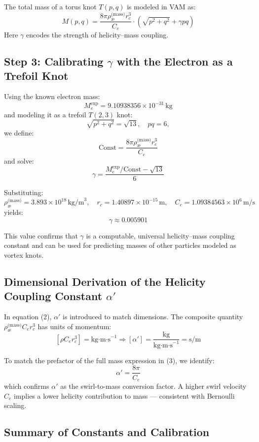 The total mass of a torus knot \( T(p,q) \) is modeled in VAM as:
\[
M(p,q) = \frac{8\pi \rho_\text{\ae}^{\text{(mass)}} r_c^3}{C_e} \cdot \left( \sqrt{p^2 + q^2} + \gamma pq \right)
\tag{3}
\]
Here \( \gamma \) encodes the strength of helicity–mass coupling.

\subsection*{Step 3: Calibrating \( \gamma \) with the Electron as a Trefoil Knot}

Using the known electron mass:
\[
M_e^{\text{exp}} = 9.10938356 \times 10^{-31} \, \text{kg}
\]
and modeling it as a trefoil \( T(2,3) \) knot:
\[
\sqrt{p^2 + q^2} = \sqrt{13}, \quad pq = 6,
\]
we define:
\[
\text{Const} = \frac{8\pi \rho_\text{\ae}^{\text{(mass)}} r_c^3}{C_e}
\]
and solve:
\[
\gamma = \frac{M_e^{\text{exp}} / \text{Const} - \sqrt{13}}{6}
\]

Substituting:
\[
\rho_\text{\ae}^{\text{(mass)}} = 3.893 \times 10^{18} \, \text{kg/m}^3, \quad
r_c = 1.40897 \times 10^{-15} \, \text{m}, \quad
C_e = 1.09384563 \times 10^6 \, \text{m/s}
\]
yields:
\[
\boxed{\gamma \approx 0.005901}
\]

This value confirms that \( \gamma \) is a computable, universal helicity–mass coupling constant and can be used for predicting masses of other particles modeled as vortex knots.

\subsection*{Dimensional Derivation of the Helicity Coupling Constant \( \alpha' \)}

In equation (2), \( \alpha' \) is introduced to match dimensions. The composite quantity \( \rho_\text{\ae}^{\text{(mass)}} C_e r_c^3 \) has units of momentum:
\[
[\rho C_e r_c^3] = \text{kg·m·s}^{-1}
\Rightarrow
[\alpha'] = \frac{\text{kg}}{\text{kg·m·s}^{-1}} = \text{s/m}
\]

To match the prefactor of the full mass expression in (3), we identify:
\[
\boxed{\alpha' = \frac{8\pi}{C_e}}
\]
which confirms \( \alpha' \) as the swirl-to-mass conversion factor. A higher swirl velocity \( C_e \) implies a lower helicity contribution to mass — consistent with Bernoulli scaling.

\subsection*{Summary of Constants and Calibration}

